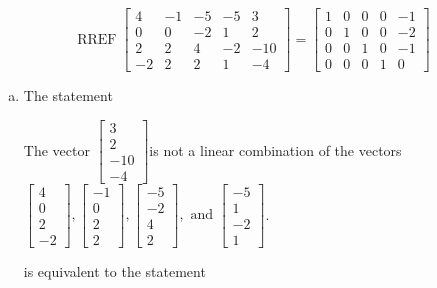\begin{exerciseAnswer} 
\[\operatorname{RREF}  \left[\begin{array}{cccc|c}
4 & -1 & -5 & -5 & 3 \\
0 & 0 & -2 & 1 & 2 \\
2 & 2 & 4 & -2 & -10 \\
-2 & 2 & 2 & 1 & -4
\end{array}\right] = \left[\begin{array}{cccc|c}
1 & 0 & 0 & 0 & -1 \\
0 & 1 & 0 & 0 & -2 \\
0 & 0 & 1 & 0 & -1 \\
0 & 0 & 0 & 1 & 0
\end{array}\right] \]
\begin{enumerate}[(a)]
\item  The statement 
\begin{center}\begin{minipage}{0.8\textwidth}
 The vector \( \left[\begin{array}{c}
3 \\
2 \\
-10 \\
-4
\end{array}\right] \)is not a linear combination of the vectors \( \left[\begin{array}{c}
4 \\
0 \\
2 \\
-2
\end{array}\right] , \left[\begin{array}{c}
-1 \\
0 \\
2 \\
2
\end{array}\right] , \left[\begin{array}{c}
-5 \\
-2 \\
4 \\
2
\end{array}\right] , \text{ and } \left[\begin{array}{c}
-5 \\
1 \\
-2 \\
1
\end{array}\right] \). 
\end{minipage}\end{center}
     is equivalent to the statement 
\begin{center}\begin{minipage}{0.8\textwidth}

\end{minipage}
\end{center}
\end{enumerate}
\end{exerciseAnswer}
